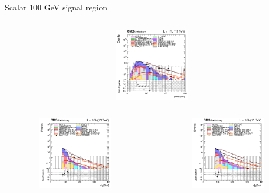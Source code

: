\documentclass[8pt]{beamer}
\begin{document}
\begin{frame}{Scalar 100 GeV signal region}
\begin{columns}
\begin{column}{0.33\textwidth}
\begin{center}
			\vspace{-8pt}
			\begin{block}{}\end{block}\vspace{10pt}
     			\includegraphics[width=1.0\textwidth, height=90pt]{figs/2018/log_cratio_topCR_ll_DNN_signal0_scalar100_METcorrected_pt.png}
    		\end{center}		
		\end{column}
\end{columns}
\begin{columns}
		\begin{column}{0.33\textwidth}
			\begin{center}
     			\includegraphics[width=1.0\textwidth, height=90pt]{figs/2016/log_cratio_topCR_ll_DNN_signal0_scalar100_mt2ll.png}
    		\end{center}		
		\end{column}
		\begin{column}{0.33\textwidth}
			\begin{center}
     			\includegraphics[width=1.0\textwidth, height=90pt]{figs/2017/log_cratio_topCR_ll_DNN_signal0_scalar100_mt2ll.png}
    		\end{center}		
		\end{column}

\end{columns}
\end{frame}
\end{document}
